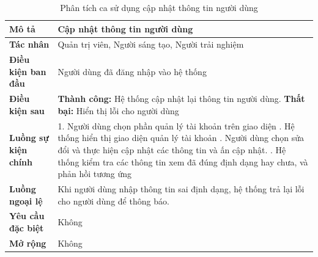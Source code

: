 \begin{table}
\centering
\caption{Phân tích ca sử dụng cập nhật thông tin người dùng}
\begin{tabular}{|p{4cm}|p{10cm}|}
    \hline
\textbf{Mô tả} & Cập nhật thông tin người dùng \\ \hline
\textbf{Tác nhân} & Quản trị viên, Người sáng tạo, Người trải nghiệm \\ \hline
\textbf{Điều kiện ban đầu} & Người dùng đã đăng nhập vào hệ thống \\ \hline
\textbf{Điều kiện sau} & 
\textbf{Thành công:} Hệ thống cập nhật lại thông tin người dùng. \newline
\textbf{Thất bại:} Hiển thị lỗi cho người dùng \\ \hline
\textbf{Luồng sự kiện chính} & 
1. Người dùng chọn phần quản lý
tài khoản trên giao diện \newline
2. Hệ thống hiển thị giao diện quản
lý tài khoản \newline
3. Người dùng chọn sửa đổi và thực
hiện cập nhật các thông tin và ấn
cập nhật. \newline
4. Hệ thống kiểm tra các thông tin
xem đã đúng định dạng hay chưa,
và phản hồi tương ứng \\ \hline
\textbf{Luồng ngoại lệ} & Khi người dùng nhập thông tin sai định dạng, hệ thống trả lại lỗi cho người dùng để thông báo. \\ \hline
\textbf{Yêu cầu đặc biệt} & Không \\ \hline
\textbf{Mở rộng} & Không \\ \hline
\end{tabular}
\end{table}

